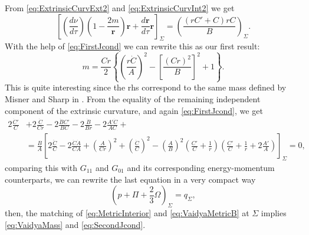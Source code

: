 From \ref{eq:ExtrinsicCurvExt2} and \ref{eq:ExtrinsicCurvInt2} we get
\begin{equation}
 \left[\left(\frac{d\nu}{d\tau}\right)\left(1 - \frac{2m}{\textbf{r}}\right)\textbf{r} + \frac{d\textbf{r}}{d\tau}\textbf{r}\right]_{\Sigma} =  \left(\frac{(rC' +C)rC}{B}\right)_{\Sigma}.
\end{equation}
With the help of \ref{eq:FirstJcond} we can rewrite this as our first result:
\begin{equation}
\label{eq:VaidyaMass}
	m = \frac{Cr}{2}\left\{ \left(\frac{r\dot{C}}{A}\right)^2 - \left[\frac{(Cr)^2}{B}\right]^2 + 1\right\}.
\end{equation} 
This is quite interesting since the rhs correspond to the same mass defined by Misner and Sharp in \cite{misner1964relativistic}. From the equality of the remaining independent component of the extrinsic curvature, and again \ref{eq:FirstJcond}, we get \cite{pinheiro2008radiating}\cite{herrera2009dynamics}
\begin{align}\nonumber
	2 \frac{\dot{C}'}{C} &+ 2 \frac{\dot{C}}{Cr} - 2\frac{\dot{B}C'}{BC} - 2\frac{\dot{B}}{Br} - 2\frac{A'\dot{C}}{AC} + \\
	&= \frac{B}{A} \left[2\frac{\ddot{C}}{C} -2\frac{\dot{C}\dot{A}}{CA} + \left(\frac{A}{Cr}\right)^2 + \left(\frac{\dot{C}}{C}\right)^2 - \left(\frac{A}{B}\right)^2 \left(\frac{C'}{C} + \frac{1}{r}\right)\left(\frac{C'}{C} + \frac{1}{r} + 2 \frac{A'}{A}\right)\right]_{\Sigma} = 0,
\end{align}
comparing this with $G_{11}$ and $G_{01} $ and its corresponding energy-momentum counterparts, we can rewrite the last equation in a very compact way
\begin{equation}
	\label{eq:SecondJcond}
	\left(p + \Pi + \frac{2}{3}\Omega\right)_{\Sigma} = q_{\Sigma},
\end{equation}
then, the matching of \ref{eq:MetricInterior} and \ref{eq:VaidyaMetricB} at $\Sigma$ implies \ref{eq:VaidyaMass} and \ref{eq:SecondJcond}. 

